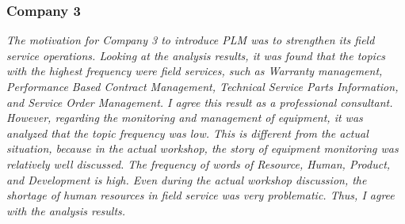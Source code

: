 \documentclass[10pt, conference, compsocconf]{IEEEtran}
\begin{document}
\subsubsection{Company 3}
{\it The motivation for Company 3 to introduce PLM was to strengthen its field service operations. Looking at the analysis results, it was found that the topics with the highest frequency were field services, such as Warranty management, Performance Based Contract Management, Technical Service Parts Information, and Service Order Management. I agree this result as a professional consultant. However, regarding the monitoring and management of equipment, it was analyzed that the topic frequency was low. This is different from the actual situation, because in the actual workshop, the story of equipment monitoring was relatively well discussed. The frequency of words of Resource, Human, Product, and Development is high. Even during the actual workshop discussion, the shortage of human resources in field service was very problematic. Thus, I agree with the analysis results.}
\smallskip
\end{document}
